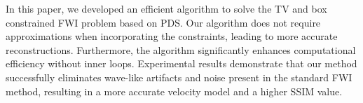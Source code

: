 In this paper, we developed an efficient algorithm to solve the TV and box constrained FWI problem based on PDS.
Our algorithm does not require approximations when incorporating the constraints, leading to more accurate reconstructions.
Furthermore, the algorithm significantly enhances computational efficiency without inner loops.
Experimental results demonstrate that our method successfully eliminates wave-like artifacts and noise present in the standard FWI method, resulting in a more accurate velocity model and a higher SSIM value.
